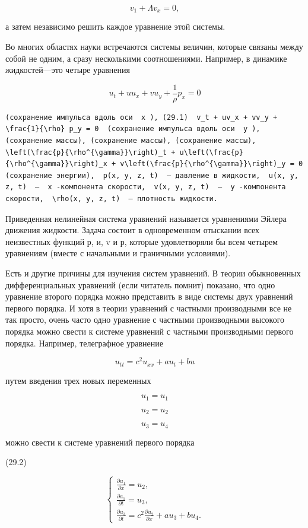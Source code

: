 \documentclass[
  ukrainian,
]{article}
\begin{document}
\[
v_1 + \Lambda v_x = 0,
\]

а затем независимо решить каждое уравнение этой системы.

Во многих областях науки встречаются системы величин, которые связаны
между собой не одним, а сразу несколькими соотношениями. Например, в
динамике жидкостей---это четыре уравнения

\[
u_t + uu_x + vu_y + \frac{1}{\rho} p_x = 0
\]

\begin{verbatim}
(сохранение импульса вдоль оси  x ), (29.1)  v_t + uv_x + vv_y + \frac{1}{\rho} p_y = 0  (сохранение импульса вдоль оси  y ), (сохранение массы), (сохранение массы), (сохранение массы),  \left(\frac{p}{\rho^{\gamma}}\right)_t + u\left(\frac{p}{\rho^{\gamma}}\right)_x + v\left(\frac{p}{\rho^{\gamma}}\right)_y = 0  (сохранение энергии),  p(x, y, z, t)  — давление в жидкости,  u(x, y, z, t)  —  x -компонента скорости,  v(x, y, z, t)  —  y -компонента скорости,  \rho(x, y, z, t)  — плотность жидкости.
\end{verbatim}

Приведенная нелинейная система уравнений называется уравнениями Эйлера
движения жидкости. Задача состоит в одновременном отыскании всех
неизвестных функций р, и, v и р, которые удовлетворяли бы всем четырем
уравнениям (вместе с начальными и граничными условиями).

Есть и другие причины для изучения систем уравнений. В теории
обыкновенных дифференциальных уравнений (если читатель помнит) показано,
что одно уравнение второго порядка можно представить в виде системы двух
уравнений первого порядка. И хотя в теории уравнений с частными
производными все не так просто, очень часто одно уравнение с частными
производными высокого порядка можно свести к системе уравнений с
частными производными первого порядка. Например, телеграфное уравнение

\[
u_{tt} = c^2 u_{xx} + a u_t + b u
\]

путем введения трех новых переменных

\[
u_1 = u_1
\]

\[
u_2 = u_2
\]

\[
u_3 = u_4
\]

можно свести к системе уравнений первого порядка

(29.2)

\[
\begin{cases} \frac{\partial u_1}{\partial x} = u_2, \\ \frac{\partial a_1}{\partial t} = u_3, \\ \frac{\partial u_3}{\partial t} = c^2 \frac{\partial u_2}{\partial x} + au_3 + bu_4. \end{cases}
\]
\end{document}
